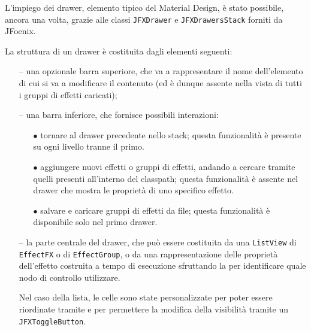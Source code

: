 
            L'impiego dei drawer, elemento tipico del Material Design, è stato possibile, ancora una volta, grazie alle classi \texttt{JFXDrawer} e \texttt{JFXDrawersStack} forniti da JFoenix.

            La struttura di un drawer è costituita dagli elementi seguenti:
            \begin{itemize}
                \item[--] una opzionale barra superiore, che va a rappresentare il nome dell'elemento di cui si va a modificare il contenuto (ed è dunque assente nella vista di tutti i gruppi di effetti caricati);

                \item[--] una barra inferiore, che fornisce possibili interazioni:
                \begin{itemize}
                    \item[$\bullet$] tornare al drawer precedente nello stack; questa funzionalità è presente su ogni livello tranne il primo.
                    \item[$\bullet$] aggiungere nuovi effetti o gruppi di effetti, andando a cercare tramite  quelli presenti all'interno del classpath; questa funzionalità è assente nel drawer che mostra le proprietà di uno specifico effetto.
                    \item[$\bullet$] salvare e caricare gruppi di effetti da file; questa funzionalità è disponibile solo nel primo drawer.
                \end{itemize}

                \item[--] la parte centrale del drawer, che può essere costituita da una \texttt{ListView} di \texttt{EffectFX} o di \texttt{EffectGroup}, o da una rappresentazione delle proprietà dell'effetto costruita a tempo di esecuzione sfruttando la  per identificare quale nodo di controllo utilizzare.

                Nel caso della lista, le celle sono state personalizzate per poter essere riordinate tramite  e per permettere la modifica della visibilità tramite un \texttt{JFXToggleButton}. %

            \end{itemize}


